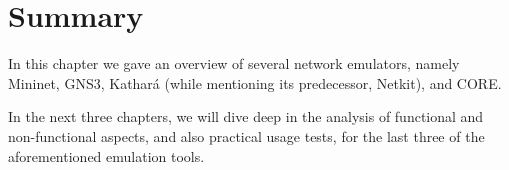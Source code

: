 \section{Summary}
\label{sec:exemulsummary}

In this chapter we gave an overview of several network emulators, namely Mininet, GNS3, Kathará (while mentioning its predecessor, Netkit), and CORE.

In the next three chapters, we will dive deep in the analysis of functional and non-functional aspects, and also practical usage tests, for the last three of the aforementioned emulation tools.

